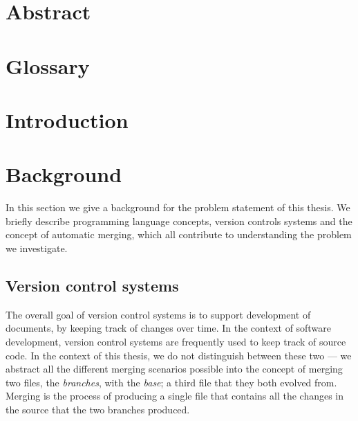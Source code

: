 \documentclass[11pt]{article}
\author{Kasper Videbæk}
\date{\today}
\begin{document}
\maketitle

\clearpage
\section*{Abstract}
\clearpage
\setcounter{tocdepth}{2}
\tableofcontents

\clearpage 

\section*{Glossary}

\clearpage 
\section{Introduction}


\clearpage 
\section{Background}
In this section we give a background for the problem statement of this thesis. We briefly describe programming language concepts, version controls systems and the concept of automatic merging, which all contribute to understanding the problem we investigate.

\subsection{Version control systems}
The overall goal of version control systems is to support development of documents, by keeping track of changes over time. In the context of software development, version control systems are frequently used to keep track of source code. In the context of this thesis, we do not distinguish between these two --- we abstract all the different merging scenarios possible into the concept of merging two files, the \textit{branches}, with the \textit{base}; a third file that they both evolved from. Merging is the process of producing a single file that contains all the changes in the source that the two branches produced.
\end{document}
